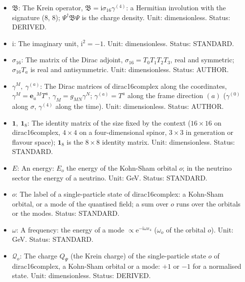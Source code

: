 \documentclass[
  10pt,
]{article}
\begin{document}
\begin{itemize}
  states, its adjoint with respect to the scalar product of that space
  (for the quantised dirac16complex the indefinite Krein scalar
  product). Status: STANDARD.
\item
  \(\mathfrak{B}\): The Krein operator,
  \(\mathfrak{B} = \mathrm{i}\sigma_{16}\gamma^{(4)}\): a Hermitian
  involution with the signature (8, 8); \(\Psi^\dagger\mathfrak{B}\Psi\)
  is the charge density. Unit: dimensionless. Status: DERIVED.
\item
  \(\mathrm{i}\): The imaginary unit, \(\mathrm{i}^2 = -1\). Unit:
  dimensionless. Status: STANDARD.
\item
  \(\sigma_{16}\): The matrix of the Dirac adjoint,
  \(\sigma_{16} = T_0T_1T_2T_3\), real and symmetric; \(\sigma_{16}T_a\)
  is real and antisymmetric. Unit: dimensionless. Status: AUTHOR.
\item
  \(\gamma^M,\ \gamma^{(a)}\): The Dirac matrices of dirac16complex
  along the coordinates, \(\gamma^M = \mathbf{e}_a{}^MT^a\),
  \(\gamma_M = g_{MN}\gamma^N\); \(\gamma^{(a)} = T^a\) along the frame
  direction \((a)\) (\(\gamma^{(0)}\) along \(\sigma\), \(\gamma^{(4)}\)
  along the time). Unit: dimensionless. Status: AUTHOR.
\item
  \(\mathbf{1},\ \mathbf{1}_8\): The identity matrix of the size fixed
  by the context (\(16 \times 16\) on dirac16complex, \(4 \times 4\) on
  a four-dimensional spinor, \(3 \times 3\) in generation or flavour
  space); \(\mathbf{1}_8\) is the \(8 \times 8\) identity matrix. Unit:
  dimensionless. Status: STANDARD.
\item
  \(E\): An energy: \(E_o\) the energy of the Kohn-Sham orbital \(o\);
  in the neutrino sector the energy of a neutrino. Unit: GeV. Status:
  STANDARD.
\item
  \(o\): The label of a single-particle state of dirac16complex: a
  Kohn-Sham orbital, or a mode of the quantised field; a sum over \(o\)
  runs over the orbitals or the modes. Status: STANDARD.
\item
  \(\omega\): A frequency: the energy of a mode
  \(\propto \mathrm{e}^{-\mathrm{i}\omega x_4}\) (\(\omega_o\) of the
  orbital \(o\)). Unit: GeV. Status: STANDARD.
\item
  \(\mathcal{Q}_o\): The charge \(Q_\Psi\) (the Krein charge) of the
  single-particle state \(o\) of dirac16complex, a Kohn-Sham orbital or
  a mode: \(+1\) or \(-1\) for a normalised state. Unit: dimensionless.
  Status: DERIVED.
\end{itemize}
\end{document}
